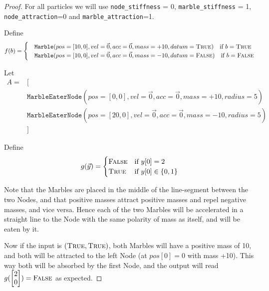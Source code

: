 \begin{proof}

    For all particles we will use \texttt{node\_stiffness} = 0, 
    \texttt{marble\_stiffness} = 1, \texttt{node\_attraction}=0 and \texttt{marble\_attraction}=1.

    Define 
    \begin{equation}
        f(b) = \begin{cases}
            &\texttt{Marble}(pos=[10, 0], vel=\vec{0}, acc=\vec{0}, mass=+10, datum=\textsc{True}) \quad \text{if $b = \textsc{True}$} \\
            &\texttt{Marble}(pos=[10, 0], vel=\vec{0}, acc=\vec{0}, mass=-10, datum=\textsc{False}) \quad \text{if $b = \textsc{False}$}
        \end{cases}
    \end{equation}
    
    Let
    \begin{align}
        A = &[ \nonumber \\
        & \texttt{MarbleEaterNode}(pos=[0, 0], vel=\vec{0}, acc=\vec{0}, mass=+10, radius=5) \nonumber \\
        & \texttt{MarbleEaterNode}(pos=[20, 0], vel=\vec{0}, acc=\vec{0}, mass=-10, radius=5) \nonumber \\
        &]
    \end{align}

    Define 
    \begin{equation}
        g(\vec{y}) = \begin{cases}
                    \textsc{False} &\text{if } y[0] = 2 \\
                    \textsc{True} &\text{if } y[0] \in \{0, 1\}
        \end{cases}
    \end{equation}
    
    Note that the Marbles are placed in the middle of the line-segment between the two Nodes, 
    and that positive masses attract positive masses and repel negative masses, and vice versa. 
    Hence each of the two Marbles will be accelerated in a straight line to the Node with the same polarity of mass as itself, 
    and will be eaten by it.
    
    Now if the input is $(\textsc{True}, \textsc{True})$, both Marbles will have a positive mass of 10, and both will be attracted to the left Node (at $pos[0] = 0$ with mass +10). This way both will be absorbed by the first Node, and the output will read $g(\begin{bmatrix}2\\0\end{bmatrix}) = \textsc{False}$ as expected.
    

\end{proof}
